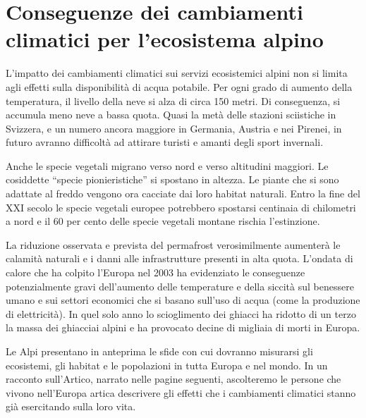 \documentclass[11pt,a4paper]{article}
\begin{document}
	
	\section{Conseguenze dei cambiamenti climatici per l'ecosistema alpino \cite{LeAlpi}}
	
	L'impatto dei cambiamenti climatici sui servizi ecosistemici alpini non si limita agli effetti sulla disponibilità di acqua potabile. Per ogni grado di aumento della temperatura, il livello della neve si alza di circa 150 metri. Di conseguenza, si accumula meno neve a bassa quota. Quasi la metà delle stazioni sciistiche in Svizzera, e un numero ancora maggiore in Germania, Austria e nei Pirenei, in futuro avranno difficoltà ad attirare turisti e amanti degli sport invernali.
	
	Anche le specie vegetali migrano verso nord e verso altitudini maggiori. Le cosiddette ``specie pionieristiche'' si spostano in altezza. Le piante che si sono adattate al freddo vengono ora cacciate dai loro habitat naturali. Entro la fine del XXI secolo le specie vegetali europee potrebbero spostarsi centinaia di chilometri a nord e il 60 per cento delle specie vegetali montane rischia l'estinzione.
	
	La riduzione osservata e prevista del permafrost verosimilmente aumenterà le calamità naturali e i danni alle infrastrutture presenti in alta quota. L'ondata di calore che ha colpito l'Europa nel 2003 ha evidenziato le conseguenze potenzialmente gravi dell'aumento delle temperature e della siccità sul benessere umano e sui settori economici che si basano sull'uso di acqua (come la produzione di elettricità). In quel solo anno lo scioglimento dei ghiacci ha ridotto di un terzo la massa dei ghiacciai alpini e ha provocato decine di migliaia di morti in Europa.
	
	Le Alpi presentano in anteprima le sfide con cui dovranno misurarsi gli ecosistemi, gli habitat e le popolazioni in tutta Europa e nel mondo. In un racconto sull'Artico, narrato nelle pagine seguenti, ascolteremo le persone che vivono nell'Europa artica descrivere gli effetti che i cambiamenti climatici stanno già esercitando sulla loro vita.
	
	\newpage
	
	
	
\end{document}
